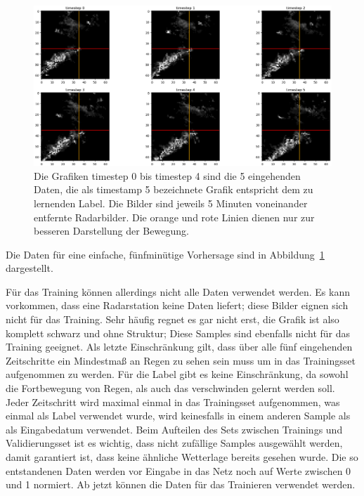 \begin{figure}[h]
	\includegraphics[width=\linewidth]{pics/5Daten_1Label_Radar.png}
	\caption[Beispielhaftes Trainingssample zur Vorhersage von 5 Minuten]{Die Grafiken timestep 0 bis timestep 4 sind die 5 eingehenden Daten, die als timestamp 5 bezeichnete Grafik entspricht dem zu lernenden Label. Die Bilder sind jeweils 5 Minuten voneinander entfernte Radarbilder. Die orange und rote Linien dienen nur zur besseren Darstellung der Bewegung.}
	\label{5D1L}
\end{figure}

Die Daten für eine einfache, fünfminütige Vorhersage sind in Abbildung~\ref{5D1L} dargestellt.

Für das Training können allerdings nicht alle Daten verwendet werden. Es kann vorkommen, dass eine Radarstation keine Daten liefert; diese Bilder eignen sich nicht für das Training. Sehr häufig regnet es gar nicht erst, die Grafik ist also komplett schwarz und ohne Struktur; Diese Samples sind ebenfalls nicht für das Training geeignet. Als letzte Einschränkung gilt, dass über alle fünf eingehenden Zeitschritte ein Mindestmaß an Regen zu sehen sein muss um in das Trainingsset aufgenommen zu werden. Für die Label gibt es keine Einschränkung, da sowohl die Fortbewegung von Regen, als auch das verschwinden gelernt werden soll. Jeder Zeitschritt wird maximal einmal in das Trainingsset aufgenommen, was einmal als Label verwendet wurde, wird keinesfalls in einem anderen Sample als als Eingabedatum verwendet. Beim Aufteilen des Sets zwischen Trainings und Validierungsset ist es wichtig, dass nicht zufällige Samples ausgewählt werden, damit garantiert ist, dass keine ähnliche Wetterlage bereits gesehen wurde.
Die so entstandenen Daten werden vor Eingabe in das Netz noch auf Werte zwischen 0 und 1 normiert. Ab jetzt können die Daten für das Trainieren verwendet werden.


